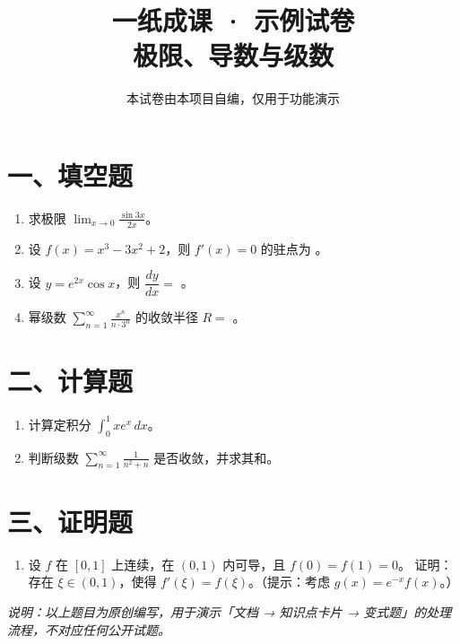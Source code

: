 \documentclass[11pt]{ctexart}
\title{一纸成课 · 示例试卷\\\large 极限、导数与级数}
\author{本试卷由本项目自编，仅用于功能演示}
\date{}
\begin{document}
\maketitle

\section*{一、填空题}

\begin{enumerate}
  \item 求极限 $\displaystyle \lim_{x \to 0}\frac{\sin 3x}{2x}$。

  \item 设 $f(x)=x^{3}-3x^{2}+2$，则 $f'(x)=0$ 的驻点为 \underline{\hspace{3em}}。

  \item 设 $y=e^{2x}\cos x$，则 $\dfrac{dy}{dx}=$ \underline{\hspace{4em}}。

  \item 幂级数 $\displaystyle \sum_{n=1}^{\infty}\frac{x^{n}}{n\cdot 3^{n}}$ 的收敛半径 $R=$ \underline{\hspace{3em}}。
\end{enumerate}

\section*{二、计算题}

\begin{enumerate}[resume]
  \item 计算定积分 $\displaystyle \int_{0}^{1} x e^{x}\,dx$。

  \item 判断级数 $\displaystyle \sum_{n=1}^{\infty}\frac{1}{n^{2}+n}$ 是否收敛，并求其和。
\end{enumerate}

\section*{三、证明题}

\begin{enumerate}[resume]
  \item 设 $f$ 在 $[0,1]$ 上连续，在 $(0,1)$ 内可导，且 $f(0)=f(1)=0$。
        证明：存在 $\xi \in (0,1)$，使得 $f'(\xi)=f(\xi)$。（提示：考虑 $g(x)=e^{-x}f(x)$。）
\end{enumerate}

\vfill
\noindent\textit{说明：以上题目为原创编写，用于演示「文档 → 知识点卡片 → 变式题」的处理流程，不对应任何公开试题。}
\end{document}

